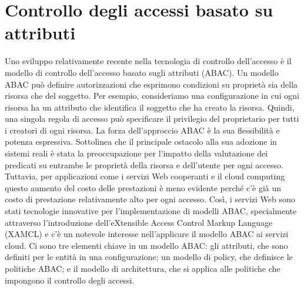 \section{Controllo degli accessi basato su attributi}
Uno sviluppo relativamente recente nella tecnologia di controllo dell'accesso è il modello di controllo dell'accesso basato sugli attributi (ABAC). Un modello ABAC può definire autorizzazioni che esprimono condizioni su proprietà sia della risorsa che del soggetto. Per esempio, consideriamo una configurazione in cui ogni risorsa ha un attributo che identifica il soggetto che ha creato la risorsa. Quindi, una singola regola di accesso può specificare il privilegio del proprietario per tutti i creatori di ogni risorsa. La forza dell'approccio ABAC è la sua flessibilità e potenza espressiva. Sottolinea che il principale ostacolo alla sua adozione in sistemi reali è stata la preoccupazione per l'impatto della valutazione dei predicati su entrambe le proprietà della risorsa e dell'utente per ogni accesso.
\singlespacing
Tuttavia, per applicazioni come i servizi Web cooperanti e il cloud computing questo aumento del costo delle prestazioni è meno evidente perché c'è già un costo di prestazione relativamente alto per ogni accesso. Così, i servizi Web sono stati tecnologie innovative per l'implementazione di modelli ABAC, specialmente attraverso l'introduzione dell'eXtensible Access Control Markup Language (XAMCL) e c'è un notevole interesse nell'applicare il modello ABAC ai servizi cloud.
\singlespacing
Ci sono tre elementi chiave in un modello ABAC: gli attributi, che sono definiti per le entità in una configurazione; un modello di policy, che definisce le politiche ABAC; e il modello di architettura, che si applica alle politiche che impongono il controllo degli accessi.
\newpage
